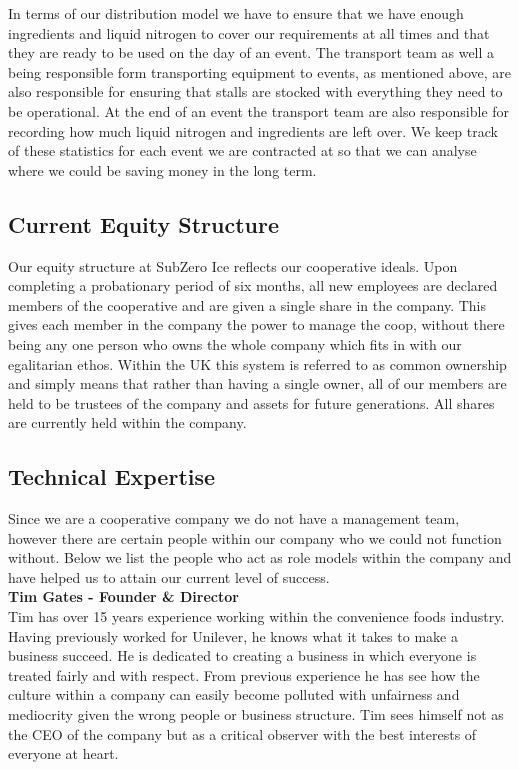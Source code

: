 \documentclass{article}
\begin{document}
\begin{itemize}
  In terms of our distribution model we have to ensure that we have enough ingredients and liquid nitrogen to cover our requirements at all times and that they are ready to be used on the day of an event. The transport team as well a being responsible form transporting equipment to events, as mentioned above, are also responsible for ensuring that stalls are stocked with everything they need to be operational. At the end of an event the transport team are also responsible for recording how much liquid nitrogen and ingredients are left over. We keep track of these statistics for each event we are contracted at so that we can analyse where we could be saving money in the long term.
  \end{itemize}

  \subsection{Current Equity Structure}

  Our equity structure at SubZero Ice reflects our cooperative ideals. Upon completing a probationary period of six months, all new employees are declared members of the cooperative and are given a single share in the company. This gives each member in the company the power to manage the coop, without there being any one person who owns the whole company which fits in with our egalitarian ethos. Within the UK this system is referred to as common ownership and simply means that rather than having a single owner, all of our members are held to be trustees of the company and assets for future generations. All shares are currently held within the company.

  \subsection{Technical Expertise}

  Since we are a cooperative company we do not have a management team, however there are certain people within our company who we could not function without. Below we list the people who act as role models within the company and have helped us to attain our current level of success. \\

  {\bf Tim Gates - Founder \& Director} \\
  Tim has over 15 years experience working within the convenience foods industry. Having previously worked for Unilever, he knows what it takes to make a business succeed. He is dedicated to creating a business in which everyone is treated fairly and with respect. From previous experience he has see how the culture within a company can easily become polluted with unfairness and mediocrity given the wrong people or business structure. Tim sees himself not as the CEO of the company but as a critical observer with the best interests of everyone at heart. \\
\end{document}

